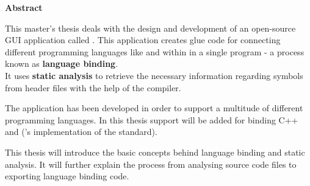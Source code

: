 \thispagestyle{empty}
\textbf{Abstract}

This master's thesis deals with the design and development of an open-source GUI application called . This application creates glue code for connecting different programming languages like  and  within in a single program - a process known as \textbf{language binding}.\\
It uses \textbf{static analysis} to retrieve the necessary information regarding symbols from  header files with the help of the   compiler.

The application has been developed in order to support a multitude of different programming languages. In this thesis support will be added for binding C++ and  ('s implementation of the  standard).

This thesis will introduce the basic concepts behind language binding and static analysis. It will further explain the process from analysing source code files to exporting language binding code.